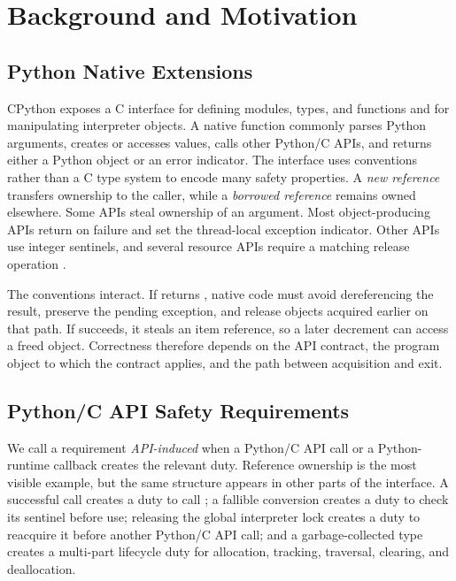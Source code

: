 \section{Background and Motivation}
\label{sec:background}

\subsection{Python Native Extensions}

CPython exposes a C interface for defining modules, types, and functions and
for manipulating interpreter objects. A native function commonly parses
Python arguments, creates or accesses  values, calls other
Python/C APIs, and returns either a Python object or an error indicator. The
interface uses conventions rather than a C type system to encode many safety
properties. A \emph{new reference} transfers ownership to the caller, while a
\emph{borrowed reference} remains owned elsewhere. Some APIs steal ownership
of an argument. Most object-producing APIs return  on failure and
set the thread-local exception indicator. Other APIs use integer sentinels,
and several resource APIs require a matching release operation
\cite{pythoncapi}.

The conventions interact. If  returns , native
code must avoid dereferencing the result, preserve the pending exception, and
release objects acquired earlier on that path. If 
succeeds, it steals an item reference, so a later decrement can access a freed
object. Correctness therefore depends on the API contract, the program object
to which the contract applies, and the path between acquisition and exit.

\subsection{Python/C API Safety Requirements}

We call a requirement \emph{API-induced} when a Python/C API call or a
Python-runtime callback creates the relevant duty. Reference ownership is the
most visible example, but the same structure appears in other parts of the
interface. A successful  call creates a duty to call
; a fallible conversion creates a duty to check its
sentinel before use; releasing the global interpreter lock creates a duty to
reacquire it before another Python/C API call; and a garbage-collected type
creates a multi-part lifecycle duty for allocation, tracking, traversal,
clearing, and deallocation.


